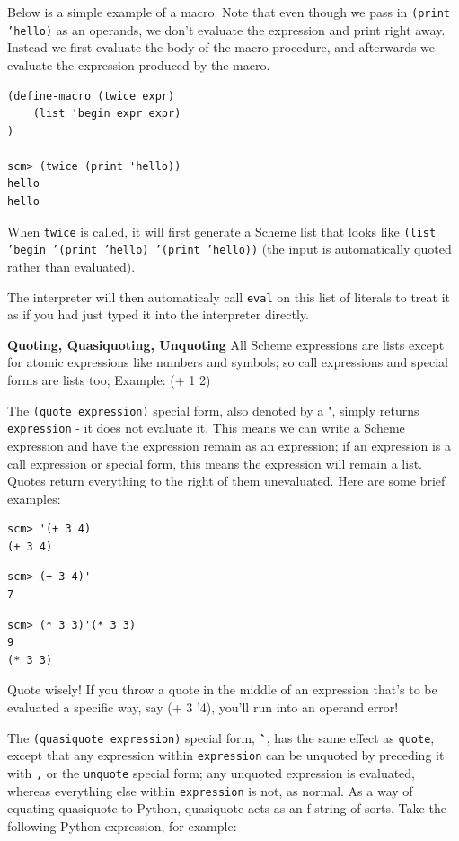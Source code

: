 Below is a simple example of a macro. Note that even though we pass in \texttt{(print 'hello)} as an operands, we don't evaluate the expression and print right away. Instead we first evaluate the body of the macro procedure, and afterwards we evaluate the expression produced by the macro. 
\vspace{1cm}
\begin{lstlisting}
(define-macro (twice expr)
    (list 'begin expr expr)
)

scm> (twice (print 'hello))
hello
hello
\end{lstlisting}

When \texttt{twice} is called, it will first generate a Scheme list that looks like \texttt{(list 'begin '(print 'hello) '(print 'hello))} (the input is automatically quoted rather than evaluated).

The interpreter will then automaticaly call \texttt{eval} on this list of literals to treat it as if you had just typed it into the interpreter directly. 

\newpage
\textbf{Quoting, Quasiquoting, Unquoting} All Scheme expressions are lists except for atomic expressions like numbers and symbols; so call expressions and special forms are lists too; Example: (+ 1 2)

The \texttt{(quote expression)} special form, also denoted by a \textbf{\'}, simply returns \texttt{expression} - it does not evaluate it. 
This means we can write a Scheme expression and have the expression remain as an expression; if an expression is a call expression or special form, this means the expression will remain a list. 
Quotes return everything to the right of them unevaluated. Here are some brief examples:

\begin{lstlisting}
scm> '(+ 3 4)
(+ 3 4)
\end{lstlisting}
\begin{lstlisting}
scm> (+ 3 4)'
7
\end{lstlisting}
\begin{lstlisting}
scm> (* 3 3)'(* 3 3)
9
(* 3 3)
\end{lstlisting}
Quote wisely! If you throw a quote in the middle of an expression that's to be evaluated a specific way, say (+ 3 '4), you'll run into an operand error!

The \texttt{(quasiquote expression)} special form, \textbf{\`}, has the same effect as \texttt{quote}, except that any expression within \texttt{expression} can be unquoted by preceding it with \texttt{,} or the \texttt{unquote} special form; any unquoted expression is evaluated, whereas everything else within \texttt{expression} is not, as normal. 
As a way of equating quasiquote to Python, quasiquote acts as an f-string of sorts. Take the following Python expression, for example:

